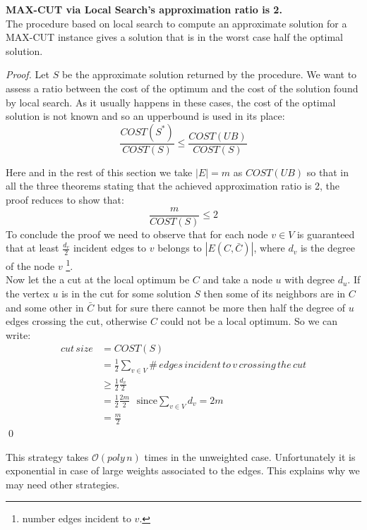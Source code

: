 \begin{theorem}{\textbf{MAX-CUT via Local Search's approximation ratio is 2.}}
\\
  The procedure based on local search to compute an approximate solution for a MAX-CUT instance gives a solution that is in the worst case half the optimal solution.
\end{theorem}
\begin{proof}
  Let $S$ be the approximate solution returned by the procedure.
  We want to assess a ratio between the cost of the optimum and the cost of the solution found by local search.
  As it usually happens in these cases, the cost of the optimal solution is not known and so an upperbound is used in its place:
  \[ \frac{COST(S^{*})}{COST(S)} \leq \frac{COST(UB)}{COST(S)} \]
  
  Here and in the rest of this section we take $|E|=m $ as $COST(UB)$ so that in all the three theorems stating that the achieved approximation ratio is 2, the proof reduces to show that:
  \[ \frac{m}{COST(S)} \leq 2 \]
  To conclude the proof we need to observe that for each node $v \in V$ is guaranteed that at least $\frac{d_v}{2}$ incident edges to $ v $ belongs to $|E(C,\bar{C})|$, where $ d_v $ is the degree of the node $ v $ 
  \footnote{number edges incident to $ v $.}.\\
  Now let the a cut at the local optimum be $ C $ and take a node $ u $ with degree $ d_u $. If the vertex $u$ is in the cut for some solution $S$ then some of its neighbors are in $C$ and some other in $\bar{C}$ but for sure there cannot be more then half the degree of $u$ edges crossing the cut, otherwise $C$ could not be a local optimum.
  So we can write:
  \begin{align*}
  cut\, size & = COST(S) \\
             & = \frac{1}{2} \sum_{v \in V} \#\, edges\,incident\,to\,v \,crossing\, the\, cut \\
             & \geq \frac{1}{2} \frac{d_v}{2}  \\
             & = \frac{1}{2} \frac{2m}{2} \,\,\,\, \text{since} \sum_{v \in V} d_v = 2m\\
             & = \frac{m}{2}
  \end{align*}
  \qed
  
  
  
\end{proof}

This strategy takes $\mathcal{O}(poly\, n)$ times in the unweighted case. Unfortunately it is exponential in case of large weights associated to the edges. This explains why we may need other strategies.


